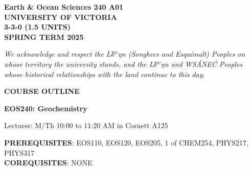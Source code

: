 \documentclass[11pt]{article}
\def\schwa{{\tenipa\char64}}
\begin{document}

%


\hspace*{\fill}\textbf{Earth \& Ocean Sciences 240 A01}\\
\hspace*{\fill}\textbf{UNIVERSITY OF VICTORIA}\\
\hspace*{\fill}\textbf{3-3-0 (1.5 UNITS)}\\
\hspace*{\fill}\textbf{SPRING TERM 2025}\\


\noindent\hrulefill

\begin{center}
\emph{We acknowledge and respect the L\schwa\'k$^w$\schwa ŋ\schwa n (Songhees and Esquimalt) Peoples on whose territory the university stands, and the L\schwa\'k$^w$\schwa ŋ\schwa n and WS\'ANE\'C Peoples whose historical relationships with the land continue to this day.}
\end{center}

\noindent\hrulefill

\begin{center}
\Large \textbf{COURSE OUTLINE}

\Large \textbf{EOS240: Geochemistry}

\normalsize Lectures: M/Th 10:00 to 11:20 AM in Cornett A125  \\
\end{center}

\noindent\hrulefill

\textbf{PREREQUISITES}: EOS110, EOS120, EOS205, 1 of CHEM254, PHYS217, PHYS317\\
\textbf{COREQUISITES}: NONE\\
\end{document}
